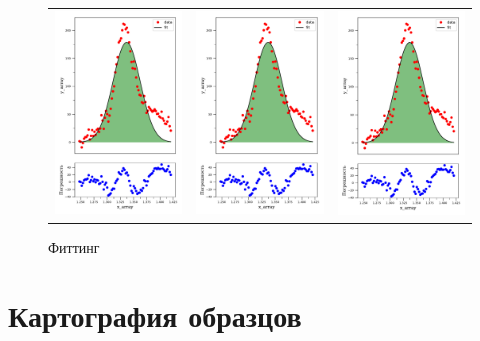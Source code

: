 		\begin{figure}[ht]\center
\begin{tabular}{rcl}
\includegraphics[width=0.33\linewidth]{fig/fitGaussian.pdf}
&
\includegraphics[width=0.33\linewidth]{fig/fitGaussian.pdf}
&
\includegraphics[width=0.33\linewidth]{fig/fitGaussian.pdf}
\end{tabular}
\caption{Фиттинг}
\label{fig:fitting}
\end{figure}
	

	

	\section{Картография образцов}
